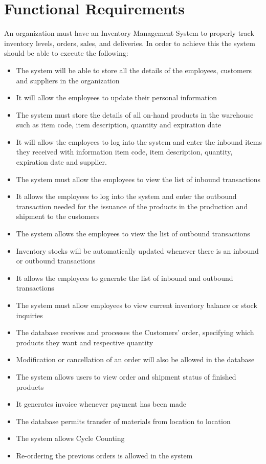 \section{Functional Requirements}

An organization must have an Inventory Management System to properly track inventory levels, orders, sales, and deliveries. In order to achieve this the system should be able to execute the following:

\begin{itemize}
    \item The system will be able to store all the details of the employees, customers and suppliers in the organization
    \item It will allow the employees to update their personal information
    \item The system must store the details of all on-hand products in the warehouse such as item code, item description, quantity and expiration date
    \item It will allow the employees to log into the system and enter the inbound items they received with information item code, item description, quantity, expiration date and supplier. 
    \item The system must allow the employees to view the list of inbound transactions
    \item It allows the employees to log into the system and enter the outbound transaction needed for the issuance of the products in the production and shipment to the customers
    \item The system allows the employees to view the list of outbound transactions
    \item Inventory stocks will be automatically updated whenever there is an inbound or outbound transactions
    \item It allows the employees to generate the list of inbound and outbound transactions 
    \item The system must allow employees to view current inventory balance or stock inquiries
    \item The database receives and processes the Customers’ order, specifying which products they want and respective quantity
    \item Modification or cancellation of an order will also be allowed in the database
    \item The system allows users to view order and shipment status of finished products
    \item It generates invoice whenever payment has been made
    \item The database permits transfer of materials from location to location
    \item The system allows Cycle Counting
    \item Re-ordering the previous orders is allowed in the system
\end{itemize}